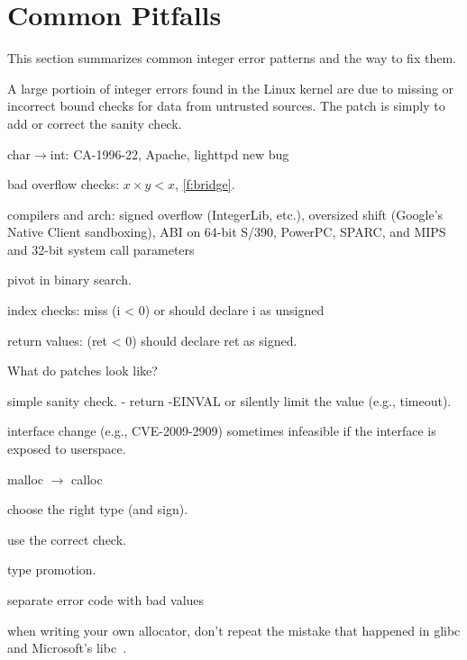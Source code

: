 \section{Common Pitfalls}
\label{s:common}

This section summarizes common integer error patterns and the way
to fix them.

A large portioin of integer errors found in the Linux kernel are
due to missing or incorrect bound checks for data from untrusted
sources.  The patch is simply to add or correct the sanity check.


char$\to$int: 
CA-1996-22,
Apache,
lighttpd new bug

bad overflow checks: $x \times y < x$, 
\autoref{f:bridge}.

compilers and arch:
signed overflow (IntegerLib, etc.),
oversized shift (Google's Native Client sandboxing),
ABI on 64-bit S/390, PowerPC, SPARC, and MIPS
and 32-bit system call parameters~\cite[CVE-2009-0029]{cve}

pivot in binary search.

index checks:
miss (i < 0) or should declare i as unsigned

return values: (ret < 0)
should declare ret as signed.

What do patches look like?

simple sanity check.
- return -EINVAL or silently limit the value (e.g., timeout).

interface change (e.g., CVE-2009-2909)
sometimes infeasible if the interface is exposed to userspace.


malloc $\to$ calloc

choose the right type (and sign).

use the correct check.

type promotion.

separate error code with bad values

when writing your own allocator, don't repeat the mistake that
happened in glibc and Microsoft's libc~\cite{rus-cert:calloc}.
